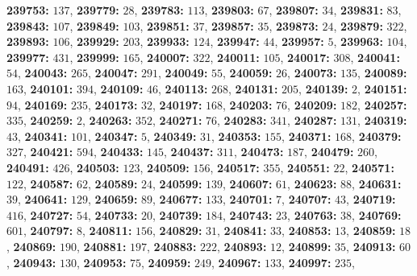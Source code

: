 \textsf{\bfseries 239753:} $137$, \textsf{\bfseries 239779:} $28$, \textsf{\bfseries 239783:} $113$, \textsf{\bfseries 239803:} $67$, \textsf{\bfseries 239807:} $34$, \textsf{\bfseries 239831:} $83$, \textsf{\bfseries 239843:} $107$, \textsf{\bfseries 239849:} $103$, \textsf{\bfseries 239851:} $37$, \textsf{\bfseries 239857:} $35$, \textsf{\bfseries 239873:} $24$, \textsf{\bfseries 239879:} $322$, \textsf{\bfseries 239893:} $106$, \textsf{\bfseries 239929:} $203$, \textsf{\bfseries 239933:} $124$, \textsf{\bfseries 239947:} $44$, \textsf{\bfseries 239957:} $5$, \textsf{\bfseries 239963:} $104$, \textsf{\bfseries 239977:} $431$, \textsf{\bfseries 239999:} $165$, \textsf{\bfseries 240007:} $322$, \textsf{\bfseries 240011:} $105$, \textsf{\bfseries 240017:} $308$, \textsf{\bfseries 240041:} $54$, \textsf{\bfseries 240043:} $265$, \textsf{\bfseries 240047:} $291$, \textsf{\bfseries 240049:} $55$, \textsf{\bfseries 240059:} $26$, \textsf{\bfseries 240073:} $135$, \textsf{\bfseries 240089:} $163$, \textsf{\bfseries 240101:} $394$, \textsf{\bfseries 240109:} $46$, \textsf{\bfseries 240113:} $268$, \textsf{\bfseries 240131:} $205$, \textsf{\bfseries 240139:} $2$, \textsf{\bfseries 240151:} $94$, \textsf{\bfseries 240169:} $235$, \textsf{\bfseries 240173:} $32$, \textsf{\bfseries 240197:} $168$, \textsf{\bfseries 240203:} $76$, \textsf{\bfseries 240209:} $182$, \textsf{\bfseries 240257:} $335$, \textsf{\bfseries 240259:} $2$, \textsf{\bfseries 240263:} $352$, \textsf{\bfseries 240271:} $76$, \textsf{\bfseries 240283:} $341$, \textsf{\bfseries 240287:} $131$, \textsf{\bfseries 240319:} $43$, \textsf{\bfseries 240341:} $101$, \textsf{\bfseries 240347:} $5$, \textsf{\bfseries 240349:} $31$, \textsf{\bfseries 240353:} $155$, \textsf{\bfseries 240371:} $168$, \textsf{\bfseries 240379:} $327$, \textsf{\bfseries 240421:} $594$, \textsf{\bfseries 240433:} $145$, \textsf{\bfseries 240437:} $311$, \textsf{\bfseries 240473:} $187$, \textsf{\bfseries 240479:} $260$, \textsf{\bfseries 240491:} $426$, \textsf{\bfseries 240503:} $123$, \textsf{\bfseries 240509:} $156$, \textsf{\bfseries 240517:} $355$, \textsf{\bfseries 240551:} $22$, \textsf{\bfseries 240571:} $122$, \textsf{\bfseries 240587:} $62$, \textsf{\bfseries 240589:} $24$, \textsf{\bfseries 240599:} $139$, \textsf{\bfseries 240607:} $61$, \textsf{\bfseries 240623:} $88$, \textsf{\bfseries 240631:} $39$, \textsf{\bfseries 240641:} $129$, \textsf{\bfseries 240659:} $89$, \textsf{\bfseries 240677:} $133$, \textsf{\bfseries 240701:} $7$, \textsf{\bfseries 240707:} $43$, \textsf{\bfseries 240719:} $416$, \textsf{\bfseries 240727:} $54$, \textsf{\bfseries 240733:} $20$, \textsf{\bfseries 240739:} $184$, \textsf{\bfseries 240743:} $23$, \textsf{\bfseries 240763:} $38$, \textsf{\bfseries 240769:} $601$, \textsf{\bfseries 240797:} $8$, \textsf{\bfseries 240811:} $156$, \textsf{\bfseries 240829:} $31$, \textsf{\bfseries 240841:} $33$, \textsf{\bfseries 240853:} $13$, \textsf{\bfseries 240859:} $18$, \textsf{\bfseries 240869:} $190$, \textsf{\bfseries 240881:} $197$, \textsf{\bfseries 240883:} $222$, \textsf{\bfseries 240893:} $12$, \textsf{\bfseries 240899:} $35$, \textsf{\bfseries 240913:} $60$, \textsf{\bfseries 240943:} $130$, \textsf{\bfseries 240953:} $75$, \textsf{\bfseries 240959:} $249$, \textsf{\bfseries 240967:} $133$, \textsf{\bfseries 240997:} $235$, 
